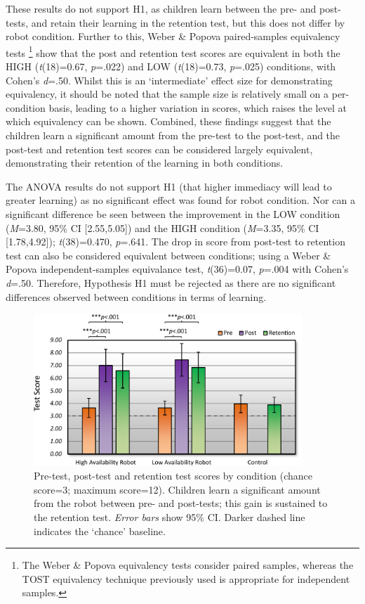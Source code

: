 These results do not support H1, as children learn between the pre- and post-tests, and retain their \gls{learning} in the retention test, but this does not differ by robot condition. Further to this, Weber \& Popova paired-samples equivalency tests \citep{weber2012testing}\footnote{The Weber \& Popova equivalency tests consider paired samples, whereas the TOST equivalency technique previously used is appropriate for independent samples.} show that the post and retention test scores are equivalent in both the HIGH (\textit{t}(18)=0.67, \textit{p}=.022) and LOW (\textit{t}(18)=0.73, \textit{p}=.025) conditions, with Cohen's \textit{d}=.50. Whilst this is an `intermediate' effect size for demonstrating equivalency, it should be noted that the sample size is relatively small on a per-condition basis, leading to a higher variation in scores, which raises the level at which equivalency can be shown. Combined, these findings suggest that the children learn a significant amount from the pre-test to the post-test, and the post-test and retention test scores can be considered largely equivalent, demonstrating their retention of the \gls{learning} in both conditions.

The ANOVA results do not support H1 (that higher immediacy will lead to greater \gls{learning}) as no significant effect was found for robot condition. Nor can a significant difference be seen between the improvement in the LOW condition (\textit{M}=3.80, 95\% CI [2.55,5.05]) and the HIGH condition (\textit{M}=3.35, 95\% CI [1.78,4.92]); \textit{t}(38)=0.470, \textit{p}=.641. The drop in score from post-test to retention test can also be considered equivalent between conditions; using a Weber \& Popova independent-samples equivalance test, \textit{t}(36)=0.07, \textit{p}=.004 with Cohen's \textit{d}=.50. Therefore, Hypothesis H1 must be rejected as there are no significant differences observed between conditions in terms of \gls{learning}.

\begin{figure}[t!]
    \centering
    \includegraphics[width=0.9\textwidth]{images/ch9_TestGraph.pdf}
    \caption{Pre-test, post-test and retention test scores by condition (chance score=3; maximum score=12). Children learn a significant amount from the robot between pre- and post-tests; this gain is sustained to the retention test. \textit{Error bars} show 95\% CI. Darker dashed line indicates the `chance' baseline.}
    \label{fig:testgraph}
\end{figure}

